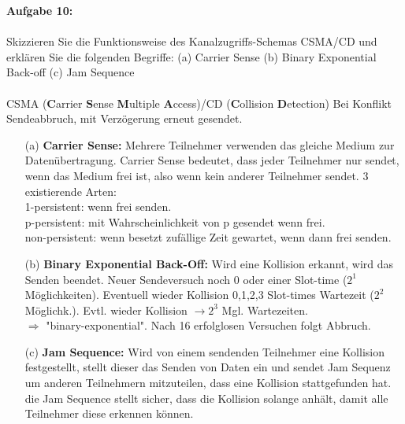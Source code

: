 \documentclass[12pt,a4paper]{report}
\theoremstyle{definition}
\begin{document}
\textbf{Aufgabe 10:}
\\
\\
Skizzieren Sie die Funktionsweise des Kanalzugriffs-Schemas CSMA/CD und erklären Sie die
folgenden Begriffe: (a) Carrier Sense (b) Binary Exponential Back-off (c) Jam Sequence
\\
\\
CSMA (\textbf{C}arrier \textbf{S}ense \textbf{M}ultiple \textbf{A}ccess)/CD (\textbf{C}ollision \textbf{D}etection)
Bei Konflikt Sendeabbruch, mit Verzögerung erneut gesendet.
\begin{itemize}
\item[(a)] \textbf{Carrier Sense:}
Mehrere Teilnehmer verwenden das gleiche Medium zur Datenübertragung. Carrier Sense bedeutet, dass jeder Teilnehmer nur sendet, wenn das Medium frei ist, also wenn kein anderer Teilnehmer sendet.
3 existierende Arten:\\
1-persistent: wenn frei  senden.\\
p-persistent: mit Wahrscheinlichkeit von p gesendet wenn frei.\\
non-persistent: wenn besetzt  zufällige Zeit gewartet, wenn dann frei  senden.

\item[(b)] \textbf{Binary Exponential Back-Off:}
Wird eine Kollision erkannt, wird das Senden beendet. Neuer Sendeversuch noch 0 oder einer Slot-time ($2^1$ Möglichkeiten). Eventuell wieder Kollision  0,1,2,3 Slot-times Wartezeit ($2^2$ Möglichk.). Evtl. wieder Kollision $\rightarrow 2^3$ Mgl. Wartezeiten.\\
$\Rightarrow$ "binary-exponential". Nach 16 erfolglosen Versuchen folgt Abbruch.

\item[(c)] \textbf{Jam Sequence:}
Wird von einem sendenden Teilnehmer eine Kollision festgestellt, stellt dieser das Senden von Daten ein und sendet Jam Sequenz um anderen Teilnehmern mitzuteilen, dass eine Kollision stattgefunden hat. die Jam Sequence stellt sicher, dass die Kollision solange anhält, damit alle Teilnehmer diese erkennen können.
\end{itemize}





\end{document}
